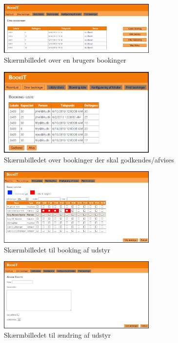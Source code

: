\begin{figure}[h!]
  \centering
    \includegraphics[width=0.7\textwidth]{Appendix/GUI-Prototype/DigitalMockup/DineBookinger}
  \caption{Skærmbilledet over en brugers bookinger}
\label{App_GUI_final_DineBookinger}
\end{figure}

\begin{figure}[h!]
  \centering
    \includegraphics[width=0.7\textwidth]{Appendix/GUI-Prototype/DigitalMockup/BookingListe}
  \caption{Skærmbilledet over bookinger der skal godkendes/afvises}
\label{App_GUI_final_BookingListe}
\end{figure}

\begin{figure}[h!]
  \centering
    \includegraphics[width=0.7\textwidth]{Appendix/GUI-Prototype/DigitalMockup/BookEquip}
  \caption{Skærmbilledet til booking af udstyr}
\label{App_GUI_final_BookEquip}
\end{figure}

\begin{figure}[h!]
  \centering
    \includegraphics[width=0.7\textwidth]{Appendix/GUI-Prototype/DigitalMockup/AendreUdstyr}
  \caption{Skærmbilledet til ændring af udstyr}
\label{App_GUI_final_AendreUdstyr}
\end{figure}

